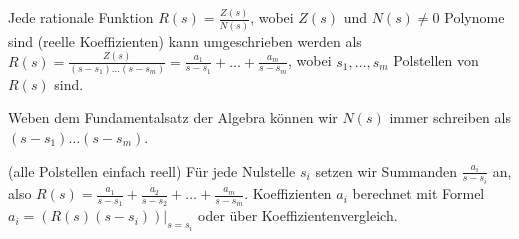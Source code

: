 Jede rationale Funktion $R(s)=\frac{Z(s)}{N(s)}$, wobei $Z(s)$ und $N(s)\neq 0$ Polynome sind (reelle Koeffizienten) kann umgeschrieben werden als $R(s)=\frac{Z(s)}{(s-s_1)\dots(s-s_m)}=\frac{a_1}{s-s_1}+\dots+\frac{a_m}{s-s_m}$, wobei $s_1, \dots, s_m$ Polstellen von $R(s)$ sind.

Weben dem Fundamentalsatz der Algebra können wir $N(s)$ immer schreiben als $(s-s_1)\dots(s-s_m)$.

 (alle Polstellen einfach reell)
Für jede Nulstelle $s_i$ setzen wir Summanden $\frac{a_i}{s-s_i}$ an, also $R(s)=\frac{a_1}{s-s_1}+\frac{a_2}{s-s_2}+ \dots + \frac{a_m}{s-s_m}$.
Koeffizienten $a_i$ berechnet mit Formel $a_i=(R(s)(s-s_i))|_{s=s_i}$ oder über Koeffizientenvergleich.